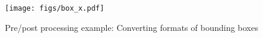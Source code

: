 \begin{figure}
    \centering
    \texttt{[image: figs/box\_x.pdf]}
    \caption{Pre/post processing example: Converting formats of bounding boxes
    }
    \label{fig:accepted1}
\end{figure}